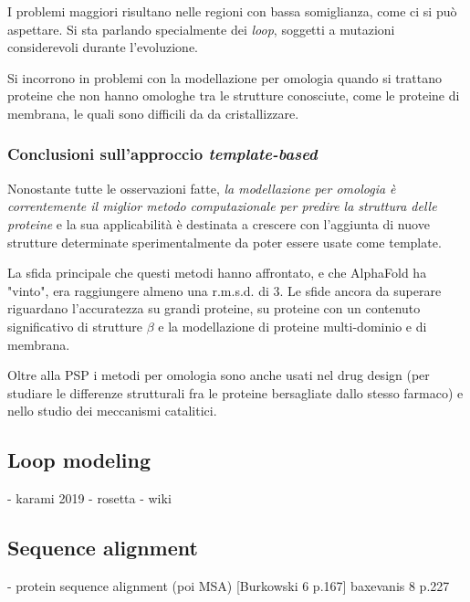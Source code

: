 \par I problemi maggiori risultano nelle regioni con bassa somiglianza, come ci si può aspettare. Si sta parlando specialmente dei \textit{loop}, soggetti a mutazioni considerevoli durante l'evoluzione.

\par Si incorrono in problemi con la modellazione per omologia quando si trattano proteine che non hanno omologhe tra le strutture conosciute, come le proteine di membrana, le quali sono difficili da da cristallizzare. \\

\subsubsection{Conclusioni sull'approccio \textit{template-based}}

\par Nonostante tutte le osservazioni fatte, \textit{la modellazione per omologia è correntemente il miglior metodo computazionale per predire la struttura delle proteine} e la sua applicabilità è destinata a crescere con l'aggiunta di nuove strutture determinate sperimentalmente da poter essere usate come template.

\par La sfida principale che questi metodi hanno affrontato, e che AlphaFold ha "vinto", era raggiungere almeno una r.m.s.d. di 3\angstrom. Le sfide ancora da superare riguardano l'accuratezza su grandi proteine, su proteine con un contenuto significativo di strutture $\beta$ e la modellazione di proteine multi-dominio e di membrana.

\par Oltre alla PSP i metodi per omologia sono anche usati nel drug design (per studiare le differenze strutturali fra le proteine bersagliate dallo stesso farmaco) e nello studio dei meccanismi catalitici.

\subsection{Loop modeling} \label{sec: loop-modeling}
- karami 2019
- rosetta
- wiki

\subsection{Sequence alignment} \label{sec:MSA}
- protein sequence alignment (poi MSA)
[Burkowski 6 p.167]
baxevanis 8 p.227


